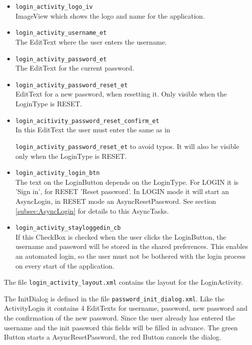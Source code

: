 \documentclass[12pt,a4paper,oneside]{report}
\newcommand{\code}[1]{\lstinline{#1}}
\begin{document}
\begin{itemize}
\item \code{login_activity_logo_iv}\\
ImageView which shows the logo and name for the application.

\item \code{login_activity_username_et}\\
The EditText where the user enters the username.

\item \code{login_activity_password_et}\\
The EditText for the current password.

\item \code{login_activity_password_reset_et}\\
EditText for a new password, when resetting it. Only visible when the LoginType is RESET.

\item \code{login_acitivity_password_reset_confirm_et}\\
In this EditText the user must enter the same as in

\code{login_activity_password_reset_et} to avoid typos. It will also be visible only when the LoginType is RESET.

\item \code{login_activity_login_btn}\\
The text on the LoginButton depends on the LoginType. For LOGIN it is 'Sign in', for RESET 'Reset password'. In LOGIN mode it will start an AsyncLogin, in RESET mode an AsyncResetPassword. See section \ref{subsec:AsyncLogin} for details to this AsyncTasks.

\item \code{login_activity_stayloggedin_cb}\\
If this CheckBox is checked when the user clicks the LoginButton, the username and password will be stored in the shared preferences. This enables an automated login, so the user must not be bothered with the login process on every start of the application.
\end{itemize}

The file \code{login_activity_layout.xml} contains the layout for the LoginActivity. 

The InitDialog is defined in the file \code{password_init_dialog.xml}. Like the ActivityLogin it contains 4 EditTexts for username, password, new password and the confirmation of the new password. Since the user already has entered the username and the init password this fields will be filled in advance. The green Button starts a AsyncResetPassword, the red Button cancels the dialog. 
\end{document}
